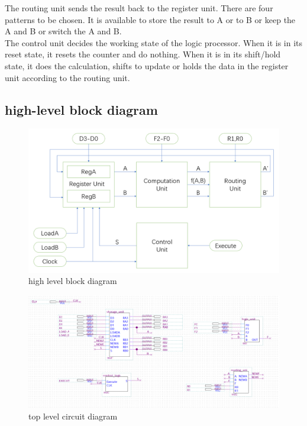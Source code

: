 \documentclass[12pt]{article}
\begin{document}
The routing unit sends the result back to the register unit. There are four patterns to be chosen. It is available to store the result to A or to B or keep the A and B or switch the A and B. \\

The control unit decides the working state of the logic processor. When it is in its reset state, it resets the counter and do nothing. When it is in its shift/hold state, it does the calculation, shifts to update or holds the data in the register unit according to the routing unit.

\subsection{high-level block diagram}
\begin{figure}[H]
    \centering
    \includegraphics[width=18cm]{high_level_diagram.png}
    \caption{high level block diagram}
\end{figure}
\begin{figure}[H]
    \centering
    \includegraphics[width=18cm]{top_level_circuit.png}
    \caption{top level circuit diagram}
\end{figure}
\end{document}
